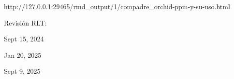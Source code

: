 \documentclass[
  12pt,
  letterpaper,
]{book}
\begin{document}
\begin{table}
\begin{tabular*}{\linewidth}{@{\extracolsep{\fill}}rlllllllllllllllllllrllrrrrllllrrrrllllllllrlrrlrllllrrlllcccccccccccccc}
\bottomrule
\end{tabular*}
\end{table}

http://127.0.0.1:29465/rmd\_output/1/compadre\_orchid-ppm-y-su-uso.html

Revisión RLT:

Sept 15, 2024

Jan 20, 2025

Sept 9, 2025


\backmatter
\end{document}
